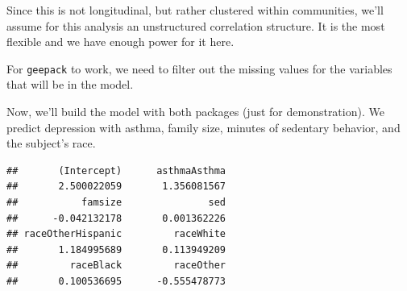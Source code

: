 \documentclass[]{tufte-book}
\newenvironment{Shaded}{}{}
\newcommand{\KeywordTok}[1]{\textcolor[rgb]{0.00,0.44,0.13}{\textbf{#1}}}
\newcommand{\DataTypeTok}[1]{\textcolor[rgb]{0.56,0.13,0.00}{#1}}
\newcommand{\StringTok}[1]{\textcolor[rgb]{0.25,0.44,0.63}{#1}}
\newcommand{\OperatorTok}[1]{\textcolor[rgb]{0.40,0.40,0.40}{#1}}
\newcommand{\NormalTok}[1]{#1}
\theoremstyle{definition}
\theoremstyle{definition}
\theoremstyle{remark}
\begin{document}
Since this is not longitudinal, but rather clustered within communities,
we'll assume for this analysis an unstructured correlation structure. It
is the most flexible and we have enough power for it here.

For \texttt{geepack} to work, we need to filter out the missing values
for the variables that will be in the model.

\begin{Shaded}
\end{Shaded}

Now, we'll build the model with both packages (just for demonstration).
We predict depression with asthma, family size, minutes of sedentary
behavior, and the subject's race.

\begin{Shaded}
\end{Shaded}

\begin{verbatim}
##       (Intercept)      asthmaAsthma 
##       2.500022059       1.356081567 
##           famsize               sed 
##      -0.042132178       0.001362226 
## raceOtherHispanic         raceWhite 
##       1.184995689       0.113949209 
##         raceBlack         raceOther 
##       0.100536695      -0.555478773
\end{verbatim}

\begin{Shaded}
\end{Shaded}
\end{document}
